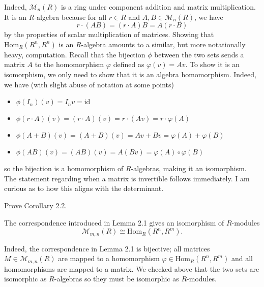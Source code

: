 \documentclass[../../master.tex]{subfiles}
\begin{document}
\begin{solution}
    Indeed, $\mathcal{M}_n(R)$ is a ring under component addition and matrix multiplication.
    It is an $R$-algebra because for all $r \in R$ and $A, B \in \mathcal{M}_n(R)$, we have
    \[
        r \cdot (AB) = (r \cdot A) B = A (r \cdot B)
    \]
    by the properties of scalar multiplication of matrices.
    Showing that $\text{Hom}_R(R^{n}, R^{n})$ is an $R$-algebra amounts to a similar, but more notationally heavy, computation.
    Recall that the bijection $\phi$ between the two sets sends a matrix $A$ to the homomorphism $\varphi$ defined as $\varphi(v) = Av$.
    To show it is an isomorphism, we only need to show that it is an algebra homomorphism.
    Indeed, we have (with slight abuse of notation at some points)
    \begin{itemize}
        \item $\phi(I_n)(v) = I_n v = \text{id}$
        \item $\phi(r \cdot A)(v) = (r \cdot A)(v) = r \cdot (Av) = r \cdot \varphi(A)$
        \item $\phi(A + B)(v) = (A + B)(v) = Av + Bv = \varphi(A) + \varphi(B)$
        \item $\phi(AB)(v) = (AB)(v) = A(Bv) = \varphi(A) \circ \varphi(B)$
    \end{itemize}
    so the bijection is a homomorphism of $R$-algebras, making it an isomorphism.
    The statement regarding when a matrix is invertible follows immediately.
    I am curious as to how this aligns with the determinant.
\end{solution}

\begin{problem}
    Prove Corollary 2.2.
    \begin{proposition}[Corollary 2.2] 
        The correspondence introduced in Lemma 2.1 gives an isomorphism of $R$-modules
        \[
            \mathcal{M}_{m, n}(R) \cong \mathrm{Hom}_R(R^{n}, R^{m}).
        \]
    \end{proposition}
\end{problem}

\begin{solution}
    Indeed, the correspondence in Lemma 2.1 is bijective; all matrices $M \in \mathcal{M}_{m, n}(R)$ are mapped to a homomorphism $\varphi \in \text{Hom}_R(R^{n}, R^{m})$ and all homomorphisms are mapped to a matrix.
    We checked above that the two sets are isomorphic as $R$-algebras so they must be isomorphic as $R$-modules.
\end{solution}
\end{document}
